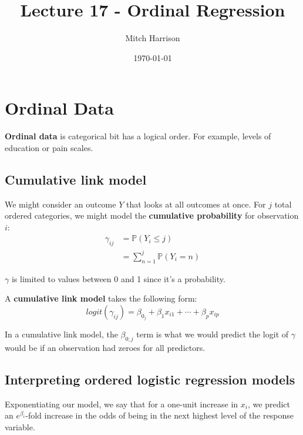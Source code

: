 \documentclass[titlepage, 12pt, leqno]{article}
\title{\Huge{Lecture 17 - Ordinal Regression}}
\author{\large{Mitch Harrison}}
\date{\today}
\begin{document}
\setlength{\parskip}{1\baselineskip}
\setlength{\parindent}{15pt}
\maketitle
\tableofcontents
\newpage


\section{Ordinal Data}

\begin{definition}
    \textbf{Ordinal data} is categorical bit has a logical order. For example,
    levels of education or pain scales.
\end{definition}

\subsection{Cumulative link model}
We might consider an outcome $Y$ that looks at all outcomes at once. For $j$
total ordered categories, we might model the \textbf{cumulative probability}
for observation $i$:
\begin{align*}
    \gamma_{ij} &= \mathbb{P}(Y_i \le j) \\
                &= \sum_{n=1}^{j}\mathbb{P}(Y_i = n)
\end{align*}
\begin{note}
    $\gamma$ is limited to values between 0 and 1 since it's a probability.
\end{note}

\begin{definition}
    A \textbf{cumulative link model} takes the following form:
    \[
        logit(\gamma_{ij}) = \beta_{0_j} + \beta_1x_{i1} + 
        \cdots + \beta_px_{ip}
    \]
\end{definition}

In a cumulative link model, the $\beta_{0;j}$ term is what we would predict the
logit of $\gamma$ would be if an observation had zeroes for all predictors.

\subsection{Interpreting ordered logistic regression models}
Exponentiating our model, we say that for a one-unit increase in $x_i$, we
predict an $e^{\beta_i}$-fold increase in the odds of being in the next 
highest level of the response variable.
\end{document}
